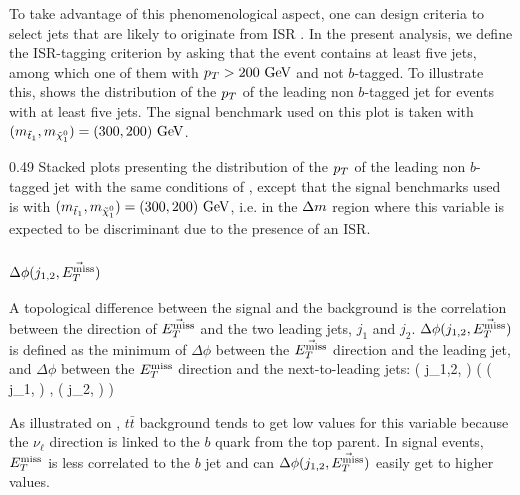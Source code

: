         To take advantage of this phenomenological aspect, one can design criteria to
        select jets that are likely to originate from ISR \cite{ISRGluinoTevatron, ISRtagging}.
        In the present analysis, we define the ISR-tagging criterion by asking that
        the event contains at least five jets, among which one of them with $p_T > 200 ~\text{GeV}$
        and not $b$-tagged. To illustrate this, 
        shows the distribution of the $p_T$ of the leading non $b$-tagged jet for
        events with at least five jets. The signal benchmark used on this plot is
        taken with $(m_{\tilde{t}_1},m_{\tilde{\chi}_1^0}) = (300,200)~\text{GeV}$.

                     {0.49}
                     {Stacked plots presenting the distribution of the $p_T$ of the leading
                     non $b$-tagged jet
                     with the same conditions of ,
                     except that the signal benchmarks used is with $(m_{\tilde{t}_1},
                     m_{\tilde{\chi}_1^0}) = (300,200)~\text{GeV}$, i.e. in the $\Delta m$ region where
                     this variable is expected to be discriminant due to
                     the presence of an ISR.}

        \subsubsection{$\Delta \phi( j_{1,2}, \vec{E_T^\text{miss}} )$ }

        A topological difference between the signal and the background is the correlation
        between the direction of $\vec{E_T^\text{miss}}$ and the two leading jets, $j_1$ and $j_2$.
        $\Delta \phi( j_{1,2}, \vec{E_T^\text{miss}} )$ is defined as the minimum of $\Delta \phi$
        between the $\vec{E_T^\text{miss}}$ direction and the leading jet, and $\Delta \phi$ between the
        $E_T^\text{miss}$ direction and the next-to-leading jets:
        {
            \Delta \phi( j_{1,2}, \vec{\MET} )
            (
                \Delta \phi( j_1, \vec{\MET} )
                ,
                \Delta \phi( j_2, \vec{\MET} )
            )
        }

        As illustrated on ,
        $t\bar{t}$ background tends to get low values for this variable because the
        $\nu_{\ell}$ direction is linked to the $b$ quark from the top parent. In signal
        events, $E_T^\text{miss}$ is less correlated to the $b$ jet and can $\Delta \phi( j_{1,2},
        \vec{E_T^\text{miss}} )$ easily get to higher values.

